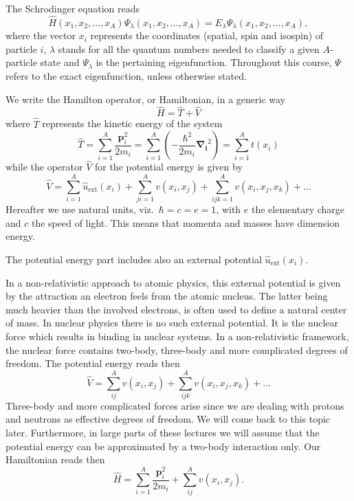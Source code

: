 \documentclass[%
twoside,                 %
final,                   %
10pt]{article}
\begin{document}
The Schrodinger equation reads 
\begin{equation}
\hat{H}(x_1, x_2, \dots , x_A) \Psi_{\lambda}(x_1, x_2, \dots , x_A) = 
E_\lambda  \Psi_\lambda(x_1, x_2, \dots , x_A), \label{eq:basicSE1}
\end{equation}
where the vector $x_i$ represents the coordinates (spatial, spin and isospin) of particle $i$, $\lambda$ stands  for all the quantum
numbers needed to classify a given $A$-particle state and $\Psi_{\lambda}$ is the pertaining eigenfunction.  Throughout this course,
$\Psi$ refers to the exact eigenfunction, unless otherwise stated.


We write the Hamilton operator, or Hamiltonian,  in a generic way 
\[
	\hat{H} = \hat{T} + \hat{V} 
\]
where $\hat{T}$  represents the kinetic energy of the system
\[
	\hat{T} = \sum_{i=1}^A \frac{\mathbf{p}_i^2}{2m_i} = \sum_{i=1}^A \left( -\frac{\hbar^2}{2m_i} \mathbf{\nabla_i}^2 \right) =
		\sum_{i=1}^A t(x_i)
\]
while the operator $\hat{V}$ for the potential energy is given by
\begin{equation}
	\hat{V} = \sum_{i=1}^A \hat{u}_{\mathrm{ext}}(x_i) + \sum_{ji=1}^A v(x_i,x_j)+\sum_{ijk=1}^Av(x_i,x_j,x_k)+\dots
\label{eq:firstv}
\end{equation}
Hereafter we use natural units, viz.~$\hbar=c=e=1$, with $e$ the elementary charge and $c$ the speed of light. This means that momenta and masses
have dimension energy. 


The potential energy part includes also an external potential $\hat{u}_{\mathrm{ext}}(x_i)$.

In a non-relativistic approach to atomic  physics, this external potential is given by the attraction an electron feels from the atomic nucleus. The latter being much heavier than the involved electrons, is often used to define a natural center of mass. In nuclear physics there is no such external potential. It is the nuclear force which results in binding in nuclear systems. In a non-relativistic framework, the nuclear force contains two-body, three-body and more complicated degrees of freedom. The potential energy reads then  
\[
	\hat{V} = \sum_{ij}^A v(x_i,x_j)+\sum_{ijk}^Av(x_i,x_j,x_k)+\dots
\]
Three-body and more  complicated forces arise since we are dealing with protons and neutrons as effective degrees of freedom. We will come back to this topic later. Furthermore, in large parts of these lectures we will assume that the potential energy can be approximated by a two-body interaction only. Our Hamiltonian reads then
\begin{equation}
	\hat{H} = \sum_{i=1}^A \frac{\mathbf{p}_i^2}{2m_i}+\sum_{ij}^A v(x_i,x_j).
\label{eq:firstH}
\end{equation}
\end{document}
